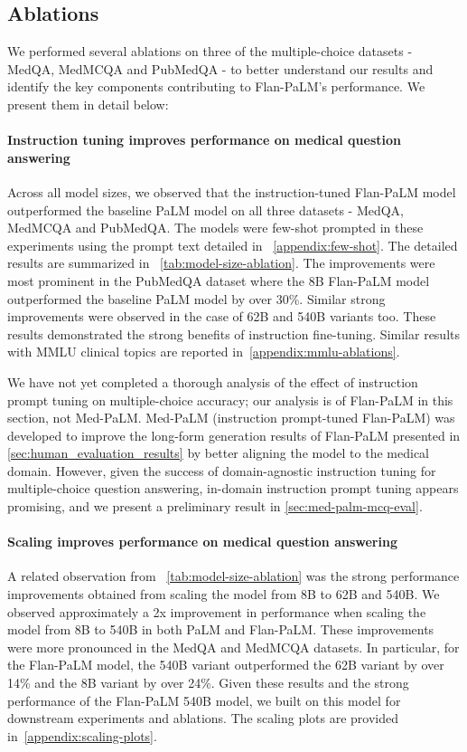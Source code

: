 \subsection{Ablations}

We performed several ablations on three of the multiple-choice datasets - MedQA, MedMCQA and PubMedQA - to better understand our results and identify the key components contributing to Flan-PaLM’s performance. We present them in detail below:

\paragraph{Instruction tuning improves performance on medical question answering}

Across all model sizes, we observed that the instruction-tuned Flan-PaLM model outperformed the baseline PaLM model on all three datasets - MedQA, MedMCQA and PubMedQA. The models were few-shot prompted in these experiments using the prompt text detailed in ~\ref{appendix:few-shot}. The detailed results are summarized in ~\ref{tab:model-size-ablation}. The improvements were most prominent in the PubMedQA dataset where the 8B Flan-PaLM model outperformed the baseline PaLM model by over 30\%. Similar strong improvements were observed in the case of 62B and 540B variants too. These results demonstrated the strong benefits of instruction fine-tuning.  Similar results with MMLU clinical topics are reported in~\ref{appendix:mmlu-ablations}. 

We have not yet completed a thorough analysis of the effect of instruction prompt tuning on multiple-choice accuracy; our analysis is of Flan-PaLM in this section, not Med-PaLM. Med-PaLM (instruction prompt-tuned Flan-PaLM) was developed to improve the long-form generation results of Flan-PaLM presented in \ref{sec:human_evaluation_results} by better aligning the model to the medical domain. However, given the success of domain-agnostic instruction tuning for multiple-choice question answering, in-domain instruction prompt tuning appears promising, and we present a preliminary result in \ref{sec:med-palm-mcq-eval}.

\paragraph{Scaling improves performance on medical question answering}

A related observation from ~\ref{tab:model-size-ablation} was the strong performance improvements obtained from scaling the model from 8B to 62B and 540B. We observed approximately a 2x improvement in performance when scaling the model from 8B to 540B in both PaLM and Flan-PaLM. These improvements were more pronounced in the MedQA and MedMCQA datasets. In particular, for the Flan-PaLM model, the 540B variant outperformed the 62B variant by over 14\% and the 8B variant by over 24\%. Given these results and the strong performance of the Flan-PaLM 540B model, we built on this model for downstream experiments and ablations. The scaling plots are provided in~\ref{appendix:scaling-plots}.

